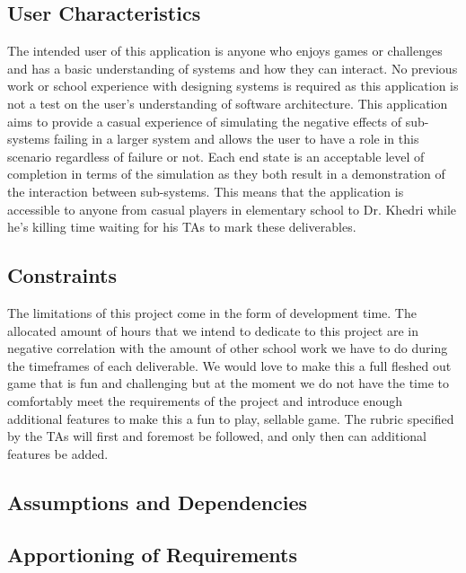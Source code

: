 \documentclass[12pt, titlepage]{article}
\begin{document}
\subsection{User Characteristics}
The intended user of this application is anyone who enjoys games or challenges and has a basic understanding of systems and how they can interact. No previous work or school experience with designing systems is required as this application is not a test on the user's understanding of software architecture. This application aims to provide a casual experience of simulating the negative effects of sub-systems failing in a larger system and allows the user to have a role in this scenario regardless of failure or not. Each end state is an acceptable level of completion in terms of the simulation as they both result in a demonstration of the interaction between sub-systems. This means that the application is accessible to anyone from casual players in elementary school to Dr. Khedri while he's killing time waiting for his TAs to mark these deliverables.

\subsection{Constraints}
The limitations of this project come in the form of development time. The allocated amount of hours that we intend to dedicate to this project are in negative correlation with the amount of other school work we have to do during the timeframes of each deliverable. We would love to make this a full fleshed out game that is fun and challenging but at the moment we do not have the time to comfortably meet the requirements of the project and introduce enough additional features to make this a fun to play, sellable game. The rubric specified by the TAs will first and foremost be followed, and only then can additional features be added.

\subsection{Assumptions and Dependencies}

\subsection{Apportioning of Requirements}
\end{document}
